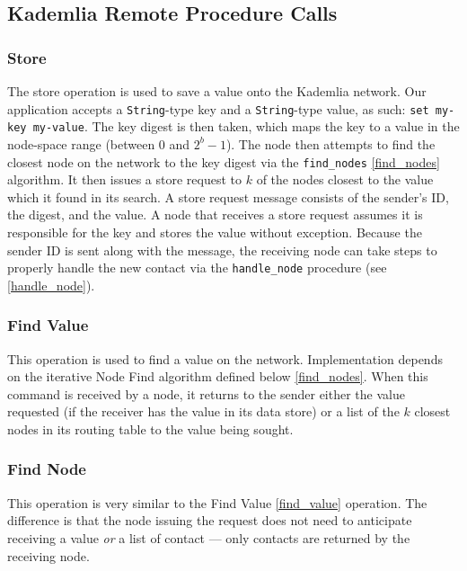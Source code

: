 \documentclass[12pt]{report}
\newcommand{\code}[1]{\colorbox{codegray}{\texttt{#1}}}
\begin{document}
        \subsection{Kademlia Remote Procedure Calls}
            \subsubsection{Store \label{store}}
               The store operation is used to save a value onto the Kademlia
               network.  Our application accepts a \code{String}-type key and a
               \code{String}-type value, as such: \code{set my-key my-value}.
               The key digest is then taken, which maps the key to a value in
               the node-space range (between 0 and $2^b-1$).  The node then
               attempts to find the closest node on the network to the key
               digest via the \code{find\_nodes} \ref{find_nodes} algorithm.  It
               then issues a store request to $k$ of the nodes closest to the
               value which it found in its search.  A store request message
               consists of the sender's ID, the digest, and the value.  A node
               that receives a store request assumes it is responsible for the
               key and stores the value without exception.  Because the sender
               ID is sent along with the message, the receiving node can take
               steps to properly handle the new contact via the
               \code{handle\_node} procedure (see \ref{handle_node}).
            \subsubsection{Find Value\label{find_value}}
                This operation is used to find a value on the network.
                Implementation depends on the iterative Node Find algorithm
                defined below \ref{find_nodes}.  When this command is received
                by a node, it returns to the sender either the value requested
                (if the receiver has the value in its data store) or a list of
                the $k$ closest nodes in its routing table to the value being
                sought.
            \subsubsection{Find Node}
                This operation is very similar to the Find Value
                \ref{find_value} operation.  The difference is that the node
                issuing the request does not need to anticipate receiving a
                value \textit{or} a list of contact --- only contacts are
                returned by the receiving node.
\end{document}
